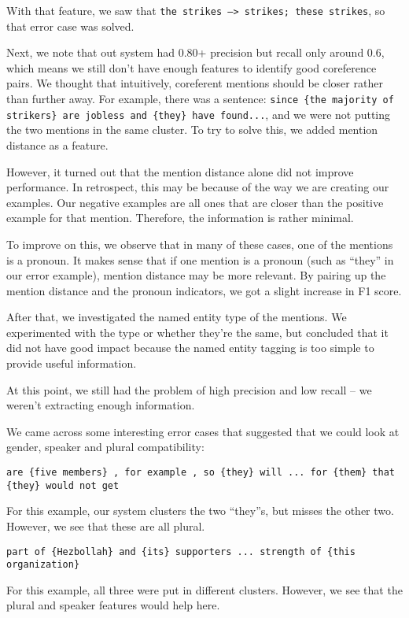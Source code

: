 \documentclass[12pt, twocolumn]{article}
\begin{document}
With that feature, we saw that \texttt{{the strikes} -->  {strikes}; {these strikes}}, so that error case was solved. 

Next, we note that out system had 0.80+ precision but recall only around 0.6, which means we still don't have enough features to identify good coreference pairs. We thought that intuitively, coreferent mentions should be closer rather than further away. For example, there was a sentence: \texttt{since \{{the majority of strikers\}} are jobless and {\{they\}} have found...}, and we were not putting the two mentions in the same cluster. To try to solve this, we added mention distance as a feature.

However, it turned out that the mention distance alone did not improve performance. In retrospect, this may be because of the way we are creating our examples. Our negative examples are all ones that are closer than the positive example for that mention. Therefore, the information is rather minimal.

To improve on this, we observe that in many of these cases, one of the mentions is a pronoun. It makes sense that if one mention is a pronoun (such as ``they'' in our error example), mention distance may be more relevant. By pairing up the mention distance and the pronoun indicators, we got a slight increase in F1 score.

After that, we investigated the named entity type of the mentions. We experimented with the type or whether they're the same, but concluded that it did not have good impact because the named entity tagging is too simple to provide useful information.

At this point, we still had the problem of high precision and low recall -- we weren't extracting enough information.

We came across some interesting error cases that suggested that we could look at gender, speaker and plural compatibility:

\texttt{are \{{five members\}} , for example , so \{{they\}} will ... for \{{them\}} that \{{they\}} would not get}

For this example, our system clusters the two ``they''s, but misses the other two. However, we see that these are all plural.

\texttt{part of {\{Hezbollah\}} and {\{its}\} supporters ... strength of \{{this organization}\}}

For this example, all three were put in different clusters. However, we see that the plural and speaker features would help here.
\end{document}
